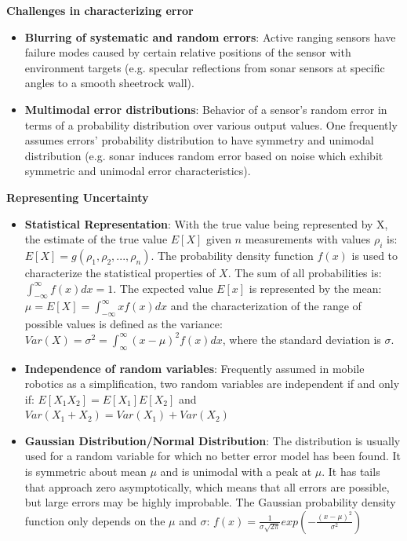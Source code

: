 \textbf{Challenges in characterizing error}
\begin{itemize}
    \item \textbf{Blurring of systematic and random errors}: Active ranging sensors have failure modes caused by certain relative positions of the sensor with environment targets (e.g. specular reflections from sonar sensors at specific angles to a smooth sheetrock wall).
    \item \textbf{Multimodal error distributions}: Behavior of a sensor's random error in terms of a probability distribution over various output values. One frequently assumes errors' probability distribution to have symmetry and unimodal distribution (e.g. sonar induces random error based on noise which exhibit symmetric and unimodal error characteristics).
\end{itemize}

\textbf{Representing Uncertainty}
\begin{itemize}
    \item \textbf{Statistical Representation}:
    With the true value being represented by X, the estimate of the true value  $E[X]$ given $n$ measurements with values $\rho_i$ is: $E[X]=g(\rho_1,\rho_2,...,\rho_n)$.
    The probability density function $f(x)$ is used to characterize the statistical properties of $X$. The sum of all probabilities is: $\int_{-\infty}^{\infty}f(x)dx=1$.
    The expected value $E[x]$ is represented by the mean: $\mu=E[X]=\int_{-\infty}^{\infty}xf(x)dx$ and the characterization of the range of possible values is defined as the variance: $Var(X)=\sigma^2=\int_{\infty}^{\infty}(x-\mu)^2f(x)dx$, where the standard deviation is $\sigma$.
    \item \textbf{Independence of random variables}:
    Frequently assumed in mobile robotics as a simplification, two random variables are independent if and only if: $E[X_1X_2]=E[X_1]E[X_2]$ and $Var(X_1+X_2)=Var(X_1)+Var(X_2)$
    \item \textbf{Gaussian Distribution/Normal Distribution}:
    The distribution is usually used for a random variable for which no better error model has been found. It is symmetric about mean $\mu$ and is unimodal with a peak at $\mu$. It has tails that approach zero asymptotically, which means that all errors are possible, but large errors may be highly improbable. The Gaussian probability density function only depends on the $\mu$ and $\sigma$: $f(x)=\frac{1}{\sigma\sqrt{2\pi}}exp\left(-\frac{\left(x-\mu\right)^2}{\sigma^2}\right)$
    
\end{itemize}
